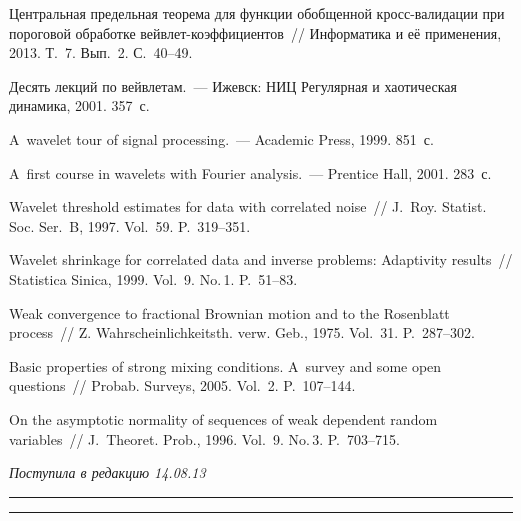\begin{multicols}{2}
{{\begin{thebibliography}{99}
 Центральная предельная теорема для
функции обобщенной кросс-ва\-ли\-да\-ции при пороговой обработке
вейв\-лет-ко\-эф\-фи\-ци\-ен\-тов~// Информатика и её применения, 2013. Т.~7.
Вып.~2. С.~40--49.

 Десять лекций по вейвлетам.~--- 
Ижевск: НИЦ Регулярная и хаотическая динамика, 2001. 357~с.

 A~wavelet tour of signal processing.~--- Academic Press, 1999.
851~с.

 A~first course in wavelets with Fourier analysis.~--- 
Prentice Hall, 2001. 283~с.

 Wavelet threshold
estimates for data with correlated noise~// J.~Roy. Statist. Soc.
Ser.~B, 1997. Vol.~59. P.~319--351.

 Wavelet shrinkage for correlated data and inverse problems: Adaptivity
results~// Statistica Sinica, 1999. Vol.~9. No.\,1. P.~51--83.

 Weak convergence to fractional Brownian motion and to the 
Rosenblatt process~// Z. Wahrscheinlichkeitsth. verw. Geb., 1975. Vol.~31. P.~287--302.

 Basic properties of strong mixing conditions. A~survey 
and some open questions~// Probab. Surveys, 2005. Vol.~2. P.~107--144.

 On the asymptotic normality of sequences of weak dependent random variables~// 
J.~Theoret. Prob., 1996. Vol.~9. No.\,3. P.~703--715.
\end{thebibliography}
} }

\end{multicols}

\hfill{\small\textit{Поступила в редакцию 14.08.13}}


\vspace*{12pt}

\hrule

\vspace*{2pt}

\hrule



\def\tit{ASYMPTOTIC PROPERTIES OF WAVELET THRESHOLDING RISK ESTIMATE IN~THE~MODEL 
OF~DATA WITH~CORRELATED NOISE}

